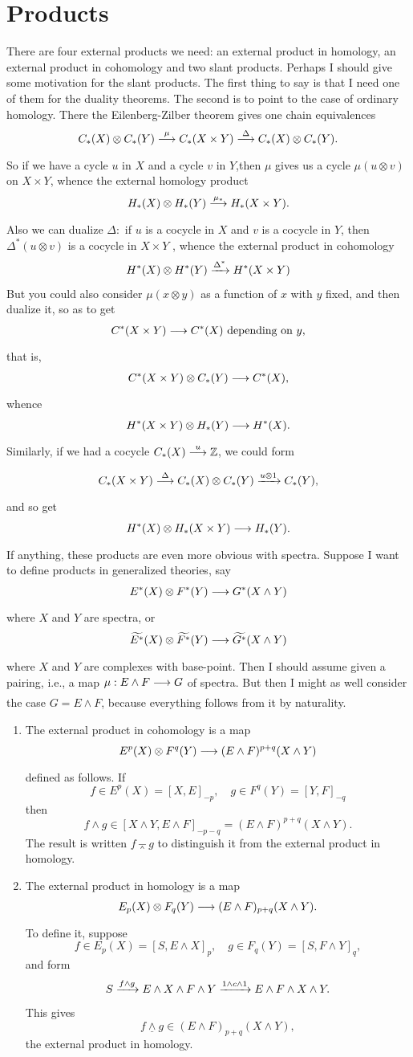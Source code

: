 \documentclass[../main]{subfiles}
\begin{document}
\chapter{Products}
\label{sec:p3c09}
\par There are four external products we need: an external product in homology, an external product in cohomology and two slant products. Perhaps I should give some motivation for the slant products. The first thing to say is that I need one of them for the duality theorems. The second is to point to the case of ordinary homology. There the Eilenberg-Zilber theorem gives one chain equivalences
\[C_\ast(X) \otimes C_\ast(Y) \lar{\mu} C_\ast(X\times Y)\lar{\Delta}C_\ast(X) \otimes C_\ast(Y).\]
So if we have a cycle $u$ in $X$ and a cycle $v$ in $Y$,then $\mu$ gives us a cycle $\mu(u\otimes v)$ on $X \times Y$, whence the external homology product
\[H_\ast(X) \otimes H_\ast(Y) \lar{\mu_\ast}H_\ast(X\times Y).\]
Also we can dualize $\Delta:$ if $u$ is a cocycle in $X$ and $v$ is a cocycle in $Y$, then $\Delta^\ast(u\otimes v)$ is a cocycle in $X \times Y$ , whence the external product in cohomology
\[H^\ast(X)\otimes H^\ast(Y) \lar{\Delta^\ast}H^\ast(X\times Y)\]
But you could also consider $\mu(x\otimes y)$ as a function of $x$ with $y$ fixed, and then dualize it, so as to get
\[C^\ast(X\times Y) \lar{} C^\ast(X) \text{ depending on $y$,}\]
that is,
\[C^\ast(X \times Y) \otimes C_\ast(Y) \lar{} C^\ast(X),\]
whence
\[H^\ast(X\times Y)\otimes H_\ast(Y) \lar{} H^\ast(X).\]
Similarly, if we had a cocycle $C_\ast(X) \lar{u} \bZ$, we could form
\[C_\ast(X \times Y) \lar{\Delta} C_\ast(X)\otimes C_\ast(Y) \lar{u\otimes 1} C_\ast(Y),\]
and so get
\[H^\ast(X)\otimes H_\ast(X\times Y) \lar{} H_\ast(Y).\]
If anything, these products are even more obvious with spectra.  Suppose I want to define products in generalized theories, say
\[E^\ast(X) \otimes F^\ast(Y) \lar {} G^\ast(X \wedge Y)\]
where $X$ and $Y$ are spectra, or
\[\widetilde {E^\ast}(X) \otimes \widetilde {F^\ast}(Y) \lar{} \widetilde {G^\ast}(X \wedge Y)\]
where $X$ and $Y$ are complexes with base-point. Then I should assume given a pairing, i.e., a map $\mu : E \wedge F \lar {} G$ of spectra. But then I might as well consider the case $G = E \wedge F$, because everything follows from it by naturality.
\begin{enumerate}
	\item[(i)] The external product in cohomology is a map \[E^p(X) \otimes F^q(Y) \lar{} (E \wedge F)^{p + q} (X \wedge Y)\] defined as follows. If \[f \in E^p(X) = [X, E]_{-p}, \quad g \in F^q(Y) = [Y, F]_{-q}\] then \[f \wedge g \in [X \wedge Y, E \wedge F]_{-p - q} = (E \wedge F)^{p + q}(X \wedge Y).\] The result is written $f \barwedge g$ to distinguish it from the external product in homology.
	\item[(ii)] The external product in homology is a map \[E_p(X) \otimes F_q(Y) \lar {} (E \wedge F)_{p + q}(X \wedge Y).\] To define it, suppose \[f \in E_p(X) = [S, E \wedge X]_p, \quad g \in F_q(Y) = [S, F \wedge Y]_q,\] and form \[S \vra{f \wedge g} E \wedge X \wedge F \wedge Y \vra {1 \wedge c \wedge 1} E \wedge F \wedge X \wedge Y.\] This gives \[f \underline \wedge g \in (E \wedge F)_{p + q}(X \wedge Y),\] the external product in homology.
\end{enumerate}
\end{document}
